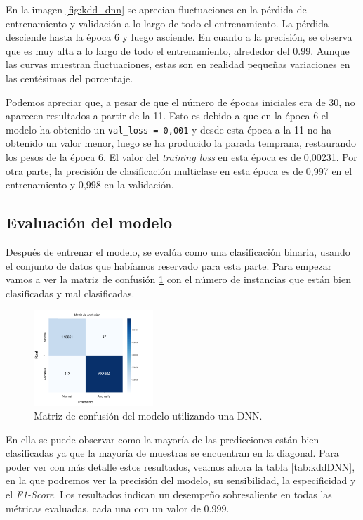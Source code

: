 En la imagen \ref{fig:kdd_dnn} se aprecian fluctuaciones en la pérdida de entrenamiento y validación a lo largo de todo el entrenamiento. La pérdida desciende hasta la época 6 y luego asciende. En cuanto a la precisión, se observa que es muy alta a lo largo de todo el entrenamiento, alrededor del 0.99. Aunque las curvas muestran fluctuaciones, estas son en realidad pequeñas variaciones en las centésimas del porcentaje. 

Podemos apreciar que, a pesar de que el número de épocas iniciales era de 30, no aparecen resultados a partir de la 11. Esto es debido a que en la época 6 el modelo ha obtenido un \lstinline|val_loss = 0,001| y desde esta época a la 11 no ha obtenido un valor menor, luego se ha producido la parada temprana, restaurando los pesos de la época 6. El valor del \textit{training loss} en esta época es de 0,00231. Por otra parte, la precisión de clasificación multiclase en esta época es de 0,997 en el entrenamiento y 0,998 en la validación. 


\subsection{Evaluación del modelo}

Después de entrenar el modelo, se evalúa como una clasificación binaria, usando el conjunto de datos que habíamos reservado para esta parte. Para empezar vamos a ver la matriz de confusión \ref{fig: dnnKDDConfusion} con el número de instancias que están bien clasificadas y mal clasificadas.

\begin{figure}[H]
    \centering
    \includegraphics[width=0.4\textwidth]{img/confusionMatrixDNN_KDD.png}
    \caption{Matriz de confusión del modelo utilizando una DNN.}
    \label{fig: dnnKDDConfusion}
\end{figure}


En ella se puede observar como la mayoría de las predicciones están bien clasificadas ya que la mayoría de muestras se encuentran en la diagonal. Para poder ver con más detalle estos resultados, veamos ahora la tabla \ref{tab:kddDNN}, en la que podremos ver la precisión del modelo, su sensibilidad, la especificidad y el \textit{F1-Score}. Los resultados indican un desempeño sobresaliente en todas las métricas evaluadas, cada una con un valor de 0.999.

